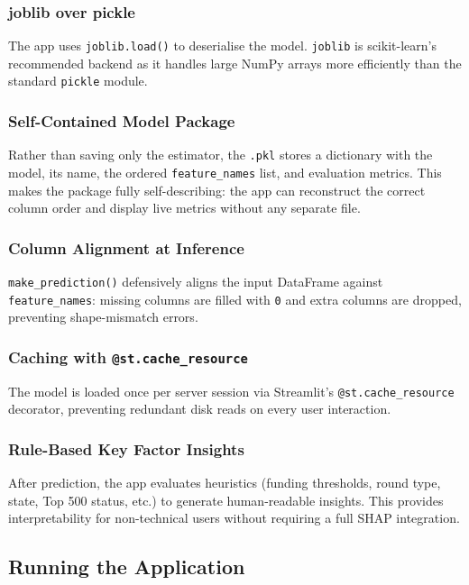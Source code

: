 \documentclass[12pt,a4paper]{article}
\begin{document}
\subsubsection{joblib over pickle}
The app uses \texttt{joblib.load()} to deserialise the model. \texttt{joblib} is
scikit-learn's recommended backend as it handles large NumPy arrays more
efficiently than the standard \texttt{pickle} module.

\subsubsection{Self-Contained Model Package}
Rather than saving only the estimator, the \texttt{.pkl} stores a dictionary with
the model, its name, the ordered \texttt{feature\_names} list, and evaluation
metrics. This makes the package fully self-describing: the app can reconstruct the
correct column order and display live metrics without any separate file.

\subsubsection{Column Alignment at Inference}
\texttt{make\_prediction()} defensively aligns the input DataFrame against
\texttt{feature\_names}: missing columns are filled with \texttt{0} and extra
columns are dropped, preventing shape-mismatch errors.

\subsubsection{Caching with \texttt{@st.cache\_resource}}
The model is loaded once per server session via Streamlit's
\texttt{@st.cache\_resource} decorator, preventing redundant disk reads on every
user interaction.

\subsubsection{Rule-Based Key Factor Insights}
After prediction, the app evaluates heuristics (funding thresholds, round type,
state, Top 500 status, etc.) to generate human-readable insights. This provides
interpretability for non-technical users without requiring a full SHAP integration.

\subsection{Running the Application}
\end{document}
